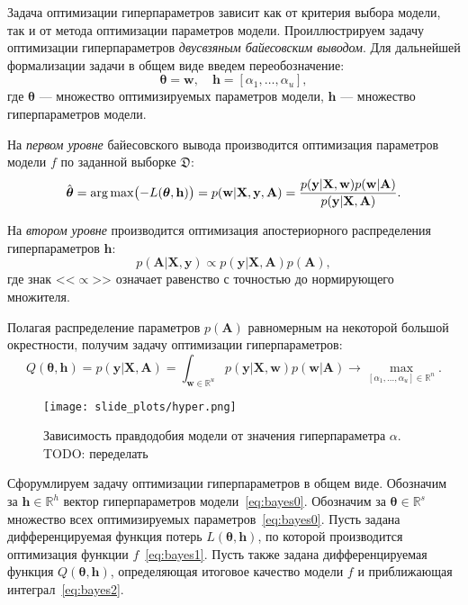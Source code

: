 
Задача оптимизации гиперпараметров зависит как от критерия выбора модели, так и от метода оптимизации параметров модели.
Проиллюстрируем задачу оптимизации гиперпараметров \textit{двусвзяным байесовским выводом}. Для дальнейшей формализации задачи в общем виде введем переобозначение:
\begin{equation}
\label{eq:bayes0}
	\boldsymbol{\theta} = \mathbf{w}, \quad \mathbf{h} = [\alpha_1, \dots, \alpha_u],	
\end{equation}
где $\boldsymbol{\theta}$ --- множество оптимизируемых параметров модели, $\mathbf{h}$ --- множество гиперпараметров модели.

На \textit{первом уровне} байесовского вывода производится оптимизация параметров модели $f$ по заданной выборке $\mathfrak{D}$:
\begin{equation}
\label{eq:bayes1}
\hat{\boldsymbol{\theta}} = \operatorname*{arg\,max} \bigl(-L(\boldsymbol{\theta}, \mathbf{h})\bigr) = p(\mathbf{w}|\mathbf{X}, \mathbf{y}, \mathbf{A}) = \frac{p(\mathbf{y}|\mathbf{X},\mathbf{w})p(\mathbf{w}|\mathbf{A})}{p(\mathbf{y}|\mathbf{X},\mathbf{A})}.
\end{equation}

На \textit{втором уровне} производится оптимизация апостериорного распределения гиперпараметров $\mathbf{h}$:
\[
p(\mathbf{A}|\mathbf{X}, \mathbf{y}) \propto p(\mathbf{y}|\mathbf{X},\mathbf{A})p(\mathbf{A}),
\]
где знак <<$\propto$>> означает равенство с точностью до нормирующего множителя.

Полагая распределение параметров $p(\mathbf{A})$ равномерным на некоторой большой окрестности, получим задачу оптимизации гиперпараметров:
\begin{equation}
\label{eq:bayes2}
	Q(\boldsymbol{\theta}, \mathbf{h}) = p(\mathbf{y}|\mathbf{X},\mathbf{A}) = \int_{\mathbf{w} \in \mathbb{R}^u} p(\mathbf{y}|\mathbf{X}, \mathbf{w}) p(\mathbf{w}|\mathbf{A}) \to \max_{[\alpha_1, \dots, \alpha_u] \in \mathbb{R}^{n}}.
\end{equation}


\begin{figure}
  \texttt{[image: slide\_plots/hyper.png]}
\label{fig:hyper}
    \caption{Зависимость правдодобия модели от значения гиперпараметра $\alpha$. TODO: переделать}
 
   
    \end{figure}


Сфорумлируем задачу оптимизации гиперпараметров в общем виде. Обозначим за $\mathbf{h}  \in \mathbb{R}^h$ вектор гиперпараметров модели~\eqref{eq:bayes0}.   Обозначим за $\boldsymbol{\theta} \in \mathbb{R}^s$ множество всех оптимизируемых параметров~\eqref{eq:bayes0}. Пусть задана дифференцируемая функция потерь $L(\boldsymbol{\theta}, \mathbf{h})$, по которой производится оптимизация функции ${f}$~\eqref{eq:bayes1}. 
Пусть также задана дифференцируемая функция $Q(\boldsymbol{\theta}, \mathbf{h})$, определяющая итоговое качество модели ${f}$ и приближающая интеграл~\eqref{eq:bayes2}.


